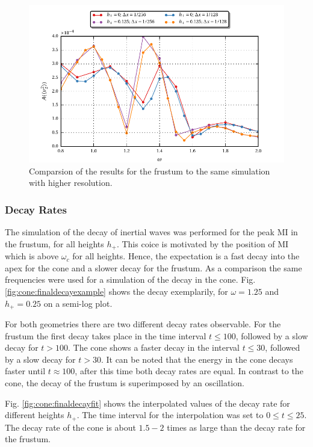 \begin{figure}[!b]
  \centering
  \includegraphics{gfx/cone/final/hd_comparison.pdf}
  \caption{
      \label{fig:cone:finalhdcomp}
      Comparsion of the results for the frustum to the same simulation with higher resolution.
    }
\end{figure}
\clearpage

\subsubsection{Decay Rates}

The simulation of the decay of inertial waves was performed for the peak M\RN{1} in the frustum,
for all heights $h_+$.
This coice is motivated by the position of M\RN{1} which is above $\omega_c$ for all heights.
Hence, the expectation is a fast decay into the apex for the cone and a slower decay for the frustum.
As a comparison the same frequencies were used for a simulation of the decay in the cone.
Fig. \ref{fig:cone:finaldecayexample} shows the decay exemplarily,
for $\omega=1.25$ and $h_+=0.25$ on a semi-log plot.

For both geometries there are two different decay rates observable.
For the frustum the first decay takes place in the time interval $t\leq 100$,
followed by a slow decay for $t>100$.
The cone shows a faster decay in the interval $ t\leq 30$, followed by a slow decay for $t>30$.
It can be noted that the energy in the cone decays faster until $t\approx100$, after this time
both decay rates are  equal.  In contrast to the cone, the decay of the frustum  is superimposed by an oscillation.

Fig. \ref{fig:cone:finaldecayfit} shows the interpolated values of the decay rate for different
heights $h_+$.  The time interval for the interpolation was set to $0 \leq t \leq 25$.
The decay rate of the cone is about $1.5-2$ times as large than the decay rate for the frustum.

